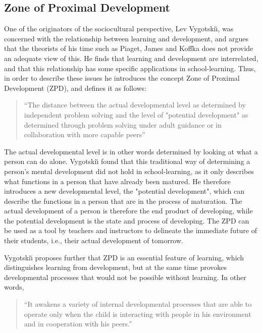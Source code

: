 \subsection{Zone of Proximal Development}
One of the originators of the sociocultural perspective, Lev Vygotski{\u\i}, was concerned with the relationship between learning and development, and argues that the theorists of his time such as Piaget, James and Koffka does not provide an adequate view of this. He finds that learning and development are interrelated, and that this relationship has some specific applications in school-learning. \citep[p. 84]{vygotskiui1978mind} Thus, in order to describe these issues he introduces the concept Zone of Proximal Development (ZPD), and defines it as follows:

\begin{quote}“The distance between the actual developmental level as determined by independent problem solving and the level of "potential development" as determined through problem solving under adult guidance or in collaboration with more capable peers” \citep[p. 86]{vygotskiui1978mind}
\end{quote}

The actual developmental level is in other words determined by looking at what a person can do alone. Vygotski{\u\i} found that this traditional way of determining a person's mental development did not hold in school-learning, as it only describes what functions in a person that have already been matured. He therefore introduces a new developmental level, the "potential development", which can describe the functions in a person that are in the process of maturation. The actual development of a person is therefore the end product of developing, while the potential development is the state and process of developing. The ZPD can be used as a tool by teachers and instructors to delineate the immediate future of their students, i.e., their actual development of tomorrow.

Vygotski{\u\i} proposes further that ZPD is an essential feature of learning, which distinguishes learning from development, but at the same time provokes developmental processes that would not be possible without learning. In other words,

\begin{quote}“It awakens a variety of internal developmental processes that are able to operate only when the child is interacting with people  in  his  environment  and  in  cooperation  with his peers.” \citep[p. 90]{vygotskiui1978mind}
\end{quote}

